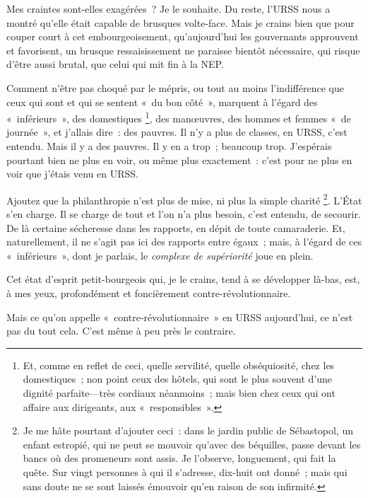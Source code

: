 \documentclass[twoside]{book} %
\begin{document}
Mes craintes sont-elles exagérées ? Je le souhaite. Du reste, l’URSS nous a montré qu’elle était capable de brusques volte-face. Mais je crains bien que pour couper court à cet embourgeoisement, qu’aujourd’hui les gouvernants approuvent et favorisent, un brusque ressaisissement ne paraisse bientôt nécessaire, qui risque d’être aussi brutal, que celui qui mit fin à la NEP.\par
Comment n’être pas choqué par le mépris, ou tout au moins l’indifférence que ceux qui sont et qui se sentent « du bon côté », marquent à l’égard des « inférieurs », des domestiques \footnote{Et, comme en reflet de ceci, quelle servilité, quelle obséquiosité, chez les domestiques ; non point ceux des hôtels, qui sont le plus souvent d’une dignité parfaite—très cordiaux néanmoins ; mais bien chez ceux qui ont affaire aux dirigeants, aux « responsibles ».}, des manœuvres, des hommes et femmes « de journée », et j’allais dire : des pauvres. Il n’y a plus de classes, en URSS, c’est entendu. Mais il y a des pauvres. Il y en a trop ; beaucoup trop. J’espérais pourtant bien ne plus en voir, ou même plus exactement : c’est pour ne plus en voir que j’étais venu en URSS.\par
Ajoutez que la philanthropie n’est plus de mise, ni plus la simple charité \footnote{Je me hâte pourtant d’ajouter ceci : dans le jardin public de Sébastopol, un enfant estropié, qui ne peut se mouvoir qu’avec des béquilles, passe devant les bancs où des promeneurs sont assis. Je l’observe, longuement, qui fait la quête. Sur vingt personnes à qui il s’adresse, dix-huit ont donné ; mais qui sans doute ne se sont laissés émouvoir qu’en raison de son infirmité.}. L’État s’en charge. Il se charge de tout et l’on n’a plus besoin, c’est entendu, de secourir. De là certaine sécheresse dans les rapports, en dépit de toute camaraderie. Et, naturellement, il ne s’agit pas ici des rapports entre égaux ; mais, à l’égard de ces « inférieurs », dont je parlais, le \emph{complexe de supériorité} joue en plein.\par
Cet état d’esprit petit-bourgeois qui, je le crains, tend à se développer là-bas, est, à mes yeux, profondément et foncièrement contre-révolutionnaire.\par
Mais ce qu’on appelle « contre-révolutionnaire » en URSS aujourd’hui, ce n’est pas du tout cela. C’est même à peu près le contraire.\par
\end{document}

